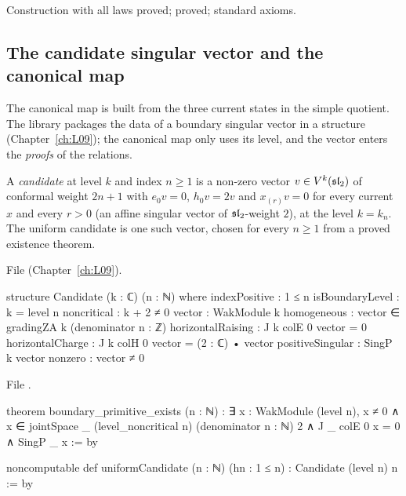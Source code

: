 \begin{status}
Construction with all laws proved;  proved; standard axioms.
\end{status}

\subsection{The candidate singular vector and the canonical map}

The canonical map is built from the three current states in the simple quotient. The library packages the
data of a boundary singular vector in a structure  (Chapter~\ref{ch:L09}); the canonical map
only uses its level, and the vector enters the \emph{proofs} of the relations.

\begin{definition}\label{l20:def:candidate}
A \emph{candidate} at level $k$ and index $n\ge1$ is a non-zero vector $v\in V^k(\mathfrak{sl}_2)$ of conformal weight
$2n+1$ with $e_0v=0$, $h_0v=2v$ and $x_{(r)}v=0$ for every current $x$ and every $r>0$ (an affine singular
vector of $\mathfrak{sl}_2$-weight $2$), at the level $k=k_n$. The uniform candidate is one such vector, chosen for
every $n\ge1$ from a proved existence theorem.
\end{definition}
\noindent File  (Chapter~\ref{ch:L09}).
\begin{leancode}
structure Candidate (k : ℂ) (n : ℕ) where
  indexPositive : 1 ≤ n
  isBoundaryLevel : k = level n
  noncritical : k + 2 ≠ 0
  vector : WakModule k
  homogeneous : vector ∈ gradingZA k (denominator n : ℤ)
  horizontalRaising : J k colE 0 vector = 0
  horizontalCharge : J k colH 0 vector = (2 : ℂ) • vector
  positiveSingular : SingP k vector
  nonzero : vector ≠ 0
\end{leancode}
\noindent File .
\begin{leancode}
theorem boundary_primitive_exists (n : ℕ) :
    ∃ x : WakModule (level n), x ≠ 0 ∧
      x ∈ jointSpace _ (level_noncritical n) (denominator n : ℕ) 2 ∧
      J _ colE 0 x = 0 ∧ SingP _ x := by

noncomputable def uniformCandidate (n : ℕ) (hn : 1 ≤ n) : Candidate (level n) n := by
\end{leancode}

